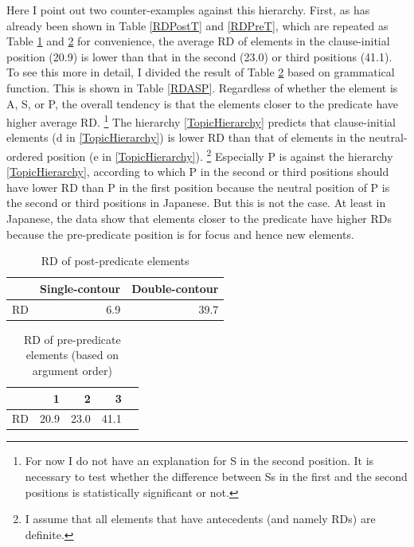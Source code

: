 Here I point out two counter-examples against this hierarchy.
First,
as has already been shown in Table \ref{RDPostT} and \ref{RDPreT},
which are repeated as Table \ref{RDPostT2} and \ref{RDPreT2} for convenience,
the average RD of elements in the clause-initial position (20.9) is lower than that in the second (23.0) or third positions (41.1).
To see this more in detail,
I divided the result of Table \ref{RDPreT2} based on grammatical function.
This is shown in Table \ref{RDASP}.
Regardless of whether the element is A, S, or P,
the overall tendency is that
the elements closer to the predicate have higher average RD.%
 \footnote{
 For now I do not have an explanation for S in the second position.
 It is necessary to test whether the difference between Ss in the first and the second positions is statistically significant or not.
 }
The  hierarchy \ref{TopicHierarchy} predicts that
clause-initial elements (d in \ref{TopicHierarchy}) is lower RD than that of elements in the neutral-ordered position (e in \ref{TopicHierarchy}).%
	\footnote{
	I assume that all elements that have antecedents (and namely RDs) are definite.
	}
Especially P is against the  hierarchy \ref{TopicHierarchy},
according to which P in the second or third positions should have lower RD than P in the first position because the neutral position of P is the second or third positions in Japanese.
But this is not the case.
At least in Japanese,
the data show that
elements closer to the predicate have higher RDs
because the pre-predicate position is for focus and hence new elements.

\begin{table}[bht]
\centering
\caption{RD of post-predicate elements}
\begin{tabular}{lrr}
\toprule
  & Single-contour & Double-contour \\
\midrule
RD & 6.9 & 39.7 \\
\bottomrule
\end{tabular}
\label{RDPostT2}
\end{table}
\begin{table}
\centering
\caption{RD of pre-predicate elements (based on argument order)}
\begin{tabular}{lrrrr}
\toprule
  &  1  & 2 & 3 \\
\midrule
RD & 20.9 & 23.0 & 41.1 \\
\bottomrule
\end{tabular}
\label{RDPreT2}
\end{table}

